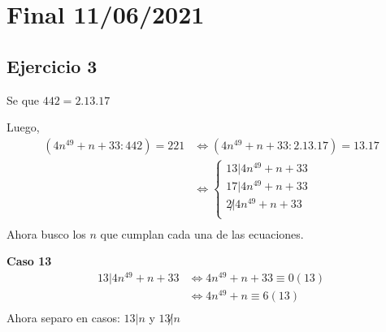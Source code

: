 
\usepackage{caratula}
\usepackage{enumerate}
\usepackage{hyperref}
\usepackage{graphicx}
\usepackage{amsfonts}
\usepackage{enumitem}
\usepackage{amsmath}

\decimalpoint
\hypersetup{colorlinks=true, linkcolor=black, urlcolor=blue}
\setlength{\parindent}{0em}
\setlength{\parskip}{0.5em}
\setcounter{tocdepth}{3} %
\setcounter{section}{0} %
\renewcommand{\thesubsubsection}{\thesubsection.\Alph{subsubsection}}
\graphicspath{ {images/} }





\maketitle
\newpage

\tableofcontents
\newpage

\section{Final 11/06/2021}

\subsection{Ejercicio 3}

Se que $ 442 = 2.13.17 $

Luego,
\begin{align*}
    (4n^{49} + n + 33:442) = 221 &\iff (4n^{49} + n + 33:2.13.17) = 13.17 \\
    &\iff \begin{cases}
        13 | 4n^{49} + n + 33 \\
        17 | 4n^{49} + n + 33 \\
        2 \not | 4n^{49} + n + 33 \\
    \end{cases} \\
\end{align*}
Ahora busco los $n$ que cumplan cada una de las ecuaciones.

\textbf{Caso 13}
\begin{align*}
    13 | 4n^{49} + n + 33 &\iff 4n^{49} + n + 33 \equiv 0 (13) \\
    &\iff 4n^{49} + n \equiv 6 (13) \\
\end{align*}
Ahora separo en casos: $ 13|n$ y $13 \not | n $

